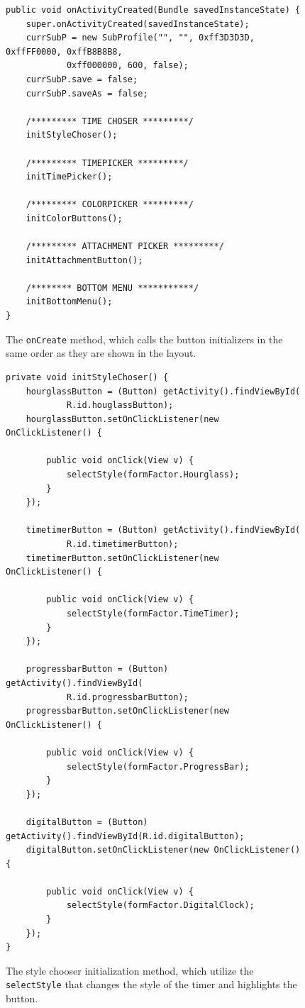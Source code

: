 \begin{figure}[H]
\begin{lstlisting}
public void onActivityCreated(Bundle savedInstanceState) {
	super.onActivityCreated(savedInstanceState);
	currSubP = new SubProfile("", "", 0xff3D3D3D, 0xffFF0000, 0xffB8B8B8,
			0xff000000, 600, false);
	currSubP.save = false;
	currSubP.saveAs = false;

	/********* TIME CHOSER *********/
	initStyleChoser();

	/********* TIMEPICKER *********/
	initTimePicker();

	/********* COLORPICKER *********/
	initColorButtons();

	/********* ATTACHMENT PICKER *********/
	initAttachmentButton();

	/******** BOTTOM MENU ***********/
	initBottomMenu();
}
\end{lstlisting}
\caption{The \texttt{onCreate} method, which calls the button initializers in the same order as they are shown in the layout.}%
\label{code:customize:oncreate}%
\end{figure}


\begin{figure}[H]
\begin{lstlisting}
private void initStyleChoser() {
	hourglassButton = (Button) getActivity().findViewById(
			R.id.houglassButton);
	hourglassButton.setOnClickListener(new OnClickListener() {

		public void onClick(View v) {
			selectStyle(formFactor.Hourglass);
		}
	});

	timetimerButton = (Button) getActivity().findViewById(
			R.id.timetimerButton);
	timetimerButton.setOnClickListener(new OnClickListener() {

		public void onClick(View v) {
			selectStyle(formFactor.TimeTimer);
		}
	});

	progressbarButton = (Button) getActivity().findViewById(
			R.id.progressbarButton);
	progressbarButton.setOnClickListener(new OnClickListener() {

		public void onClick(View v) {
			selectStyle(formFactor.ProgressBar);
		}
	});

	digitalButton = (Button) getActivity().findViewById(R.id.digitalButton);
	digitalButton.setOnClickListener(new OnClickListener() {

		public void onClick(View v) {
			selectStyle(formFactor.DigitalClock);
		}
	});
}
\end{lstlisting}
\caption{The style chooser initialization method, which utilize the \texttt{selectStyle} that changes the style of the timer and highlights the button.}%
\label{code:customize:style_choser}%
\end{figure}

